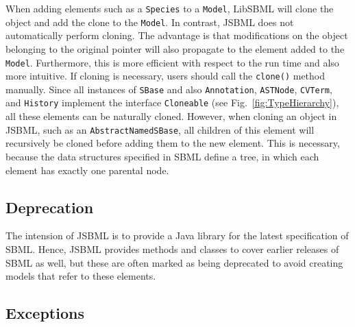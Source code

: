 \documentclass[
  BCOR12mm,
  letterpaper,
  11pt,
  headsepline,
  pointlessnumbers,
  tablecaptionabove,
  onelinecaption,
  headinclude,
  appendixprefix,
  idxtotoc,
  bibtotoc,
  twoside,
  titlepage
]{scrartcl}
\begin{document}
When adding elements such as a \texttt{Species} to a \texttt{Model}, LibSBML will
clone the object and add the clone to the \texttt{Model}. In contrast, JSBML does
not automatically perform cloning. The advantage is that modifications on the
object belonging to the original pointer will also propagate to the element
added to the \texttt{Model}. Furthermore, this is more efficient with respect to
the run time and also more intuitive. If cloning is necessary, users should call
the \texttt{clone()} method manually. Since all instances of \texttt{SBase} and also
\texttt{Annotation}, \texttt{ASTNode}, \texttt{CVTerm}, and \texttt{History} implement
the interface \texttt{Cloneable} (see Fig.~\vref{fig:TypeHierarchy}), all these
elements can be naturally cloned. However, when cloning an object in
JSBML, such as an \texttt{AbstractNamedSBase}, all children of this element will recursively be
cloned before adding them to the new element. This is necessary, because the data
structures specified in SBML define a tree, in
which each element has exactly one parental node.


\subsection{Deprecation}

The intension of JSBML is to provide a Java library for
the latest specification of SBML. Hence, JSBML provides methods and
classes to cover earlier releases of SBML as well, but these are often marked
as being deprecated to avoid creating models that refer to these 
elements.

\subsection{Exceptions}
\end{document}
